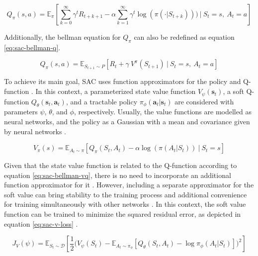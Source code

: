 \begin{equation} \label{eq:sac-state-action-value}
Q_\pi (s,a) = \mathbb{E}_{\pi} \left[ \sum_{k=0}^\infty \gamma^t R_{t+k+1} - \alpha \sum_{k=1}^\infty \gamma^t \log (\pi(\cdot | S_{t+k})))\ \Bigg|\ S_t = s,\ A_t = a \right]
\end{equation} 

Additionally, the bellman equation for $Q_\pi$ can also be redefined as equation \ref{eq:sac-bellman-q}. \par

\begin{equation} \label{eq:sac-bellman-q}
Q_\pi(s,a) = \mathbb{E}_{S_{t+1} \sim P} \left[ R_t + \gamma\ V^\pi(S_{t+1})\ |\ S_t = s,\ A_t = a \right]
\end{equation} 

To achieve its main goal, \ac{SAC} uses function approximators for the policy and Q-function \cite{haarnojaSoftActorCriticOffPolicy2018}. In this context, a parameterized state value function $V_\psi(\mathbf{s}_t)$, a soft Q-function $Q_\theta (\mathbf{s}_t, \mathbf{a}_t)$, and a tractable policy $\pi_\phi (\mathbf{a}_t|\mathbf{s}_t)$ are considered with parameters $\psi$, $\theta$, and $\phi$, respectively. Usually, the value functions are modelled as neural networks, and the policy as a Gaussian with a mean and covariance given by neural networks \cite{haarnojaSoftActorCriticOffPolicy2018}.

\begin{equation} \label{eq:sac-bellman-vq}
V_\pi (s) = \mathbb{E}_{A_t \sim \pi} \left[ Q_\pi (S_t, A_t) - \alpha \log (\pi (A_t|S_t)) \ \Big|\ S_t = s \right] 
\end{equation}

Given that the state value function is related to the Q-function according to equation \ref{eq:sac-bellman-vq}, there is no need to incorporate an additional function approximator for it \cite{haarnojaSoftActorCriticOffPolicy2018}. However, including a separate approximator for the soft value can bring stability to the training process and additional convenience for training simultaneously with other networks \cite{haarnojaSoftActorCriticOffPolicy2018}. In this context, the soft value function can be trained to minimize the squared residual error, as depicted in equation \ref{eq:sac-v-loss} \cite{haarnojaSoftActorCriticOffPolicy2018}.

\begin{equation} \label{eq:sac-v-loss}
J_V(\psi) = \mathbb{E}_{S_t \sim \mathcal{D}} \left[ \frac{1}{2} \Big( V_\psi(S_t) - \mathbb{E}_{A_t \sim \pi_\phi} [Q_\theta (S_t, A_t) - \log \pi_\phi (A_t | S_t)] \Big)^2 \right]
\end{equation}

